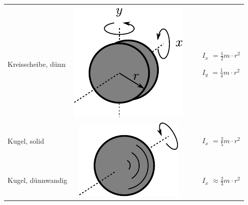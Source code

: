 \begin{table}[h!]
\begin{tabular}{m{2cm} c m{}}
\begin{itemize}
                \end{itemize} \\
Kreisscheibe, dünn &
        \begin{minipage}{0.3\textwidth}
        \centering
        \includegraphics[scale=\traegscale]{../fig/traeg-kreisscheibe-duenn.pdf}
        \end{minipage} &
                \begin{itemize}
                \item[$I_x$]$= \frac12 m \cdot r^2$
                \item[$I_y$]$= \frac14 m \cdot r^2$
                \end{itemize} \\
Kugel, solid & \multirow{2}{*}{
        \begin{minipage}{0.3\textwidth}
        \centering
        \includegraphics[scale=\traegscale]{../fig/traeg-kugel.pdf}
        \end{minipage}}
                &
                \begin{itemize}
                        \item[$I_x$]$= \frac{2}{5} m \cdot r^2$
                \end{itemize} \\
Kugel, dünnwandig & &
                \begin{itemize}
                        \item[$I_x$]$\approx \frac{2}{3} m \cdot r^2$
                \end{itemize}
\end{tabular}
\end{table}

